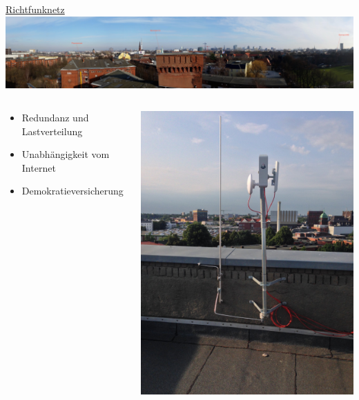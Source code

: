 \documentclass[t]{beamer}
\begin{document}
\begin{frame}{\href{http://wiki.freifunk.net/Freifunk_Hamburg/Richtfunknetz}{Richtfunknetz}}
	\includegraphics[width=\textwidth]{Bilder/fux}
	\begin{columns}
		\begin{column}{0.7\textwidth}
			\begin{itemize}
				\item Redundanz und Lastverteilung
				\item Unabhängigkeit vom Internet
				\item Demokratieversicherung
			\end{itemize}
		\end{column}
		\begin{column}{0.3\textwidth}
			\begin{center}
				\includegraphics[width=.9\textwidth]{Bilder/richtfunkmast}
			\end{center}
		\end{column}
	\end{columns}
\end{frame}
\end{document}

